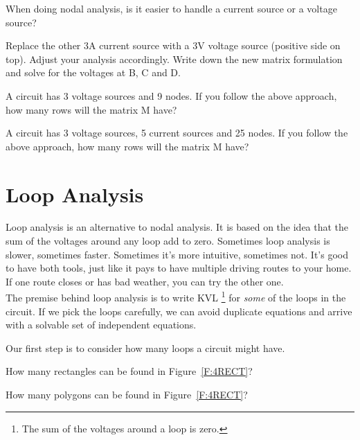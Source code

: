 \begin{alevel}
When doing nodal analysis, is it easier to handle a current source or a voltage source?
\end{alevel}

\begin{clevel}
Replace the other 3A current source with a 3V voltage source (positive side on top). Adjust your analysis accordingly. Write down the new matrix formulation and solve for the voltages at B, C and D.
\end{clevel}

\begin{clevel}
A circuit has 3 voltage sources and 9 nodes. If you follow the above approach, how many rows will the matrix M have?
\end{clevel}

\begin{clevel}
A circuit has 3 voltage sources, 5 current sources and 25 nodes. If you follow the above approach, how many rows will the matrix M have?
\end{clevel}


\section{Loop Analysis}
Loop analysis is an alternative to nodal analysis. It is based on the idea that the sum of the voltages around any loop add to zero. Sometimes loop analysis is slower, sometimes faster. Sometimes it's more intuitive, sometimes not. It's good to have both tools, just like it pays to have multiple driving routes to your home. If one route closes or has bad weather, you can try the other one.\\

The premise behind loop analysis is to write KVL \footnote{The sum of the voltages around a loop is zero.} for \emph{some} of the loops in the circuit. If we pick the loops carefully, we can avoid duplicate equations and arrive with a solvable set of independent equations.
\par
Our first step is to consider how many loops a circuit might have.
\begin{alevel}
How many rectangles can be found in Figure~\ref{F:4RECT}?
\end{alevel}

\begin{blevel}
How many polygons can be found in Figure~\ref{F:4RECT}?
\end{blevel}

